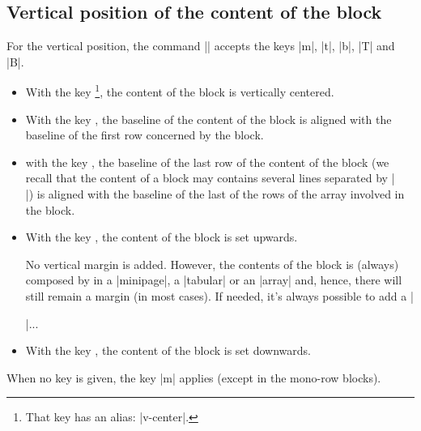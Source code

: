 \documentclass[dvipsnames]{article}%
\begin{document}
\subsection{Vertical position of the content of the block}

\label{vertical-pos-block}

For the vertical position, the command |\Blocks| accepts the keys
|m|, |t|, |b|, |T| and |B|.


\begin{itemize}
\item {} With the key
\footnote{That key has an alias: |v-center|.}, the content of the
block is vertically centered.
\item With the key , the baseline of the content of the block is aligned
with the baseline of the first row concerned by the block.
\item with the key , the baseline of the last row of the content of the
block (we recall that the content of a block may contains several lines
separated by |\\|) is aligned with the baseline of the last of the rows of the
array involved in the block.
\item With the key , the content of the block is set upwards. 

No vertical margin is added. However, the contents of the block is (always)
composed by  in a |{minipage}|, a |{tabular}| or an |{array}|
and, hence, there will still remain a margin (in most cases). If needed, it's
always possible to add a |\strut|...

\item With the key , the content of the block is set downwards.
\end{itemize}

When no key is given, the key |m| applies (except in the mono-row blocks).
\end{document}

